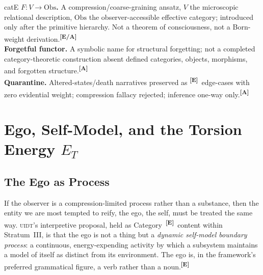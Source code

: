 \documentclass[12pt,a4paper,twoside]{article}
\theoremstyle{plain}
\theoremstyle{definition}
\theoremstyle{remark}
\newcommand{\UIDT}{\textsc{uidt}}
\newcommand{\catmark}[1]{\textsuperscript{\textsf{\textbf{[#1]}}}}
\begin{document}
\begin{evidencebox}{catE}
\textbf{$F\colon V\to\mathrm{Obs}$.} A compression/coarse-graining ansatz, $V$ the microscopic relational description, $\mathrm{Obs}$ the observer-accessible effective category; introduced only after the primitive hierarchy. Not a theorem
of consciousness, not a Born-weight derivation.\catmark{E/A}\\[0.3em]
\textbf{Forgetful functor.} A symbolic name for structural forgetting; not a completed category-theoretic construction absent defined categories, objects,
morphisms, and forgotten structure.\catmark{A}\\[0.3em]
\textbf{Quarantine.} Altered-states/death narratives preserved as \catmark{E}\ edge-cases with zero evidential weight; compression fallacy rejected; inference one-way only.\catmark{A}
\end{evidencebox}

\section{Ego, Self-Model, and the Torsion Energy \texorpdfstring{$E_T$}{E_T}}
\label{sec:ego-selfmodel-et}

\subsection{The Ego as Process}
\label{subsec:ego-as-process}

If the observer is a compression-limited process rather than a substance, then the entity we are most tempted to reify, the ego, the self, must be treated the same way. \UIDT's interpretive proposal, held as Category~\catmark{E}\ content within Stratum~III, is that the ego is not a thing but a \emph{dynamic self-model boundary process}: a continuous, energy-expending activity by which a subsystem maintains a model of itself as distinct from its environment. The ego is, in the framework's preferred grammatical figure, a verb rather than a noun.\catmark{E}
\end{document}
